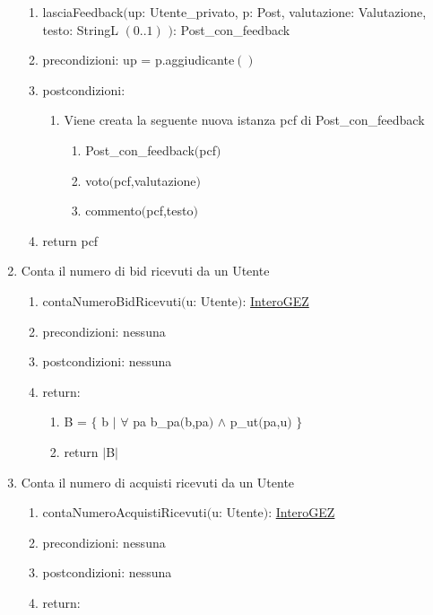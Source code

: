 \documentclass{article}
\begin{document}
\begin{enumerate}
\begin{enumerate}
        \item lasciaFeedback$($up: Utente\_privato, p: Post, valutazione: Valutazione, testo: StringL $(0..1)$ $)$: Post\_con\_feedback
        \item precondizioni: up = p.aggiudicante$()$
        \item postcondizioni:
        \begin{enumerate}
            \item Viene creata la seguente nuova istanza pcf di Post\_con\_feedback
            \begin{enumerate}
                \item Post\_con\_feedback$($pcf$)$
                \item voto$($pcf,valutazione$)$
                \item commento$($pcf,testo$)$
            \end{enumerate}
        \end{enumerate}
        \item return pcf
    \end{enumerate}
    \newpage
    \item\label{sec:contaNumeroBidRicevuti} Conta il numero di bid ricevuti da un Utente
    \begin{enumerate}
        \item contaNumeroBidRicevuti$($u: Utente$)$: \hyperref[sec:TipoInteroGEZ]{InteroGEZ}
        \item precondizioni: nessuna
        \item postcondizioni: nessuna
        \item return:
        \begin{enumerate}
            \item B = $\{$ b $|$ $\forall$ pa b\_pa$($b,pa$)$ $\land$ p\_ut$($pa,u$)$ $\}$
            \item return $|$B$|$
        \end{enumerate}
    \end{enumerate}
    \newpage
    \item\label{sec:contaNumeroAcquistiRicevuti} Conta il numero di acquisti ricevuti da un Utente
    \begin{enumerate}
        \item contaNumeroAcquistiRicevuti$($u: Utente$)$: \hyperref[sec:TipoInteroGEZ]{InteroGEZ}
        \item precondizioni: nessuna
        \item postcondizioni: nessuna
        \item return:

\end{enumerate}
\end{enumerate}
\end{document}
